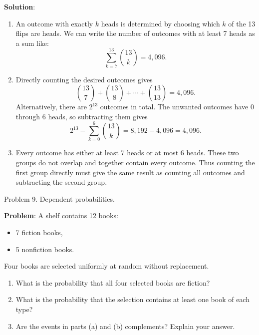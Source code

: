 \documentclass{article}
\begin{document}
\textbf{Solution}:
\begin{enumerate}[label=(\alph*)]
  \item An outcome with exactly $k$ heads is determined by choosing
  which $k$ of the 13 flips are heads. We can write the number of
  outcomes with at least 7 heads as a sum like:
  $$
  \sum_{k=7}^{13}\binom{13}{k}=4{,}096.
  $$

  \item Directly counting the desired outcomes gives
  $$
  \binom{13}{7}+\binom{13}{8}+\cdots+\binom{13}{13}
  =4{,}096.
  $$
  Alternatively, there are $2^{13}$ outcomes in total. The
  unwanted outcomes have 0 through 6 heads, so subtracting them gives
  $$
  2^{13}-\sum_{k=0}^{6}\binom{13}{k}
  =8{,}192-4{,}096
  =4{,}096.
  $$

  \item Every outcome has either at least 7 heads or at most 6 heads.
  These two groups do not overlap and together contain every outcome.
  Thus counting the first group directly must give the same result
  as counting all outcomes and subtracting the second group.
\end{enumerate}

Problem 9. Dependent probabilities.

\textbf{Problem}: A shelf contains 12 books:
\begin{itemize}
    \item 7 fiction books,
    \item 5 nonfiction books.
\end{itemize}

Four books are selected uniformly at random without replacement.

\begin{enumerate}[label=(\alph*)]
  \item What is the probability that all four selected books are fiction?
  \item What is the probability that the selection contains at least one book of each type?
  \item Are the events in parts (a) and (b) complements? Explain your answer.
\end{enumerate}
\end{document}
